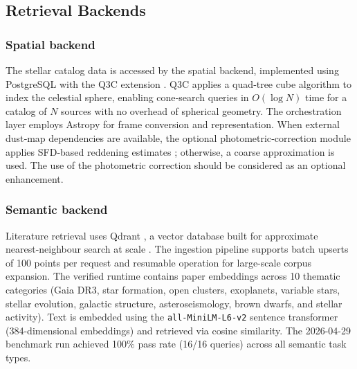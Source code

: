\documentclass[preprint,12pt,authoryear]{elsarticle}
\begin{document}
\subsection{Retrieval Backends}
\label{sec:retrieval}

\subsubsection{Spatial backend}
The stellar catalog data is accessed by the spatial backend, implemented using PostgreSQL with the Q3C extension \citep{Koposov2006}. Q3C applies a quad‑tree cube algorithm to index the celestial sphere, enabling cone‑search queries in $O(\log N)$ time for a catalog of $N$ sources with no overhead of spherical geometry. The orchestration layer employs \textsf{Astropy} \citep{AstropyCollaboration2022} for frame conversion and representation. When external dust‑map dependencies are available, the optional photometric‑correction module applies SFD‑based reddening estimates \citep{Schlegel1998}; otherwise, a coarse approximation is used. The use of the photometric correction should be considered as an optional enhancement.


\subsubsection{Semantic backend}
Literature retrieval uses Qdrant \citep{Qdrant2023}, a vector database built for approximate nearest-neighbour search at scale \citep{Malkov2020}. The ingestion pipeline supports batch upserts of 100 points per request and resumable operation for large-scale corpus expansion. The verified runtime contains \nPapersQdrant{} paper embeddings across 10 thematic categories (Gaia DR3, star formation, open clusters, exoplanets, variable stars, stellar evolution, galactic structure, asteroseismology, brown dwarfs, and stellar activity). Text is embedded using the \texttt{all-MiniLM-L6-v2} sentence transformer \citep{Reimers2019, Wang2020MiniLM} (384-dimensional embeddings) and retrieved via cosine similarity. The 2026-04-29 benchmark run achieved 100\% pass rate (16/16 queries) across all semantic task types.
\end{document}
